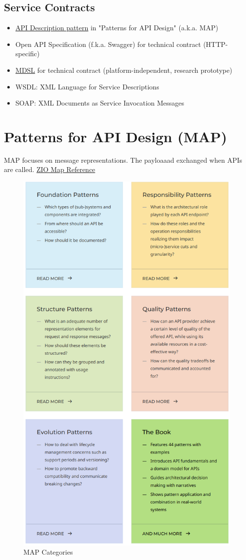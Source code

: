 \documentclass[../Main.tex]{subfiles}
\begin{document}
\subsection{Service Contracts}
\begin{itemize}
    \item \href{https://microservice-api-patterns.org/patterns/foundation/APIDescription.html}{API Description pattern}
    in "Patterns for API Design" (a.k.a. MAP)
    \item Open API Specification (f.k.a. Swagger) for technical contract (HTTP-specific) 
    \item \href{https://microservice-api-patterns.github.io/MDSL-Specification/}{MDSL}
    for technical contract (platform-independent, research prototype)
    \item WSDL: XML Language for Service Descriptions
    \item SOAP: XML Documents as Service Invocation Messages
\end{itemize}
\section{Patterns for API Design (MAP)}
MAP focuses on message representations. The payloaaad exchanged when APIs are called.
\href{https://api-patterns.org/quickstart-resources}{ZIO Map Reference}

\begin{figure}[H]
    \centering
    \includegraphics[width=0.6\linewidth]{Images/map-categories.png}
    \caption{MAP Categories}
\end{figure}
\end{document}
